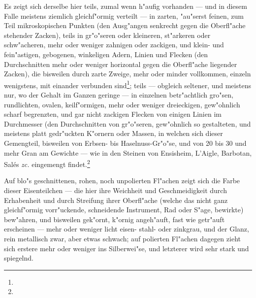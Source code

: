 \documentclass[a4paper, 11pt, oneside, german]{article}
\begin{document}
Es zeigt sich derselbe hier teils, zumal wenn h"aufig vorhanden --- und in diesem Falle meistens ziemlich gleichf"ormig verteilt --- in zarten, "au"serst feinen, zum Teil mikroskopischen Punkten (den Ausg"angen senkrecht gegen die Oberfl"ache stehender Zacken), teils in gr"o"seren oder kleineren, st"arkeren oder schw"acheren, mehr oder weniger zahnigen oder zackigen, und klein- und fein"astigen, gebogenen, winkeligen Adern, Linien und Flecken (den Durchschnitten mehr oder weniger horizontal gegen die Oberfl"ache liegender Zacken), die bisweilen durch zarte Zweige, mehr oder minder vollkommen, einzeln wenigstens, mit einander verbunden sind\footnote{}; teils --- obgleich seltener, und meistens nur, wo der Gehalt im Ganzen geringe --- in einzelnen betr"achtlich gro"sen, rundlichten, ovalen, keilf"ormigen, mehr oder weniger dreieckigen, gew"ohnlich scharf begrenzten, und gar nicht zackigen Flecken von einigen Linien im Durchmesser (den Durchschnitten von gr"o"seren, gew"ohnlich so gestalteten, und meistens platt gedr"uckten K"ornern oder Massen, in welchen sich dieser Gemengteil, bisweilen von Erbsen- bis Haselnuss-Gr"o"se, und von 20 bis 30 und mehr Gran am Gewichte --- wie in den Steinen von Ensisheim, L'Aigle, Barbotan, Salés \emph{zc.} eingemengt findet.\footnote{}

Auf blo"s geschnittenen, rohen, noch unpolierten Fl"achen zeigt sich die Farbe dieser Eisenteilchen --- die hier ihre Weichheit und Geschmeidigkeit durch Erhabenheit und durch Streifung ihrer Oberfl"ache (welche das nicht ganz gleichf"ormig vorr"uckende, schneidende Instrument, Rad oder S"age, bewirkte) bew"ahren, und bisweilen gek"ornt, k"ornig angeh"auft, fast wie getr"auft erscheinen --- mehr oder weniger licht eisen- stahl- oder zinkgrau, und der Glanz, rein metallisch zwar, aber etwas schwach; auf polierten Fl"achen dagegen zieht sich erstere mehr oder weniger ins Silberwei"se, und letzterer wird sehr stark und spiegelnd.
\end{document}
